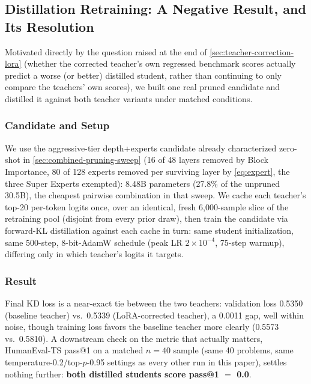 \documentclass{article}
\theoremstyle{plain}
\theoremstyle{definition}
\theoremstyle{remark}
\begin{document}
\subsection{Distillation Retraining: A Negative Result, and Its Resolution}
\label{sec:phase4-negative}

Motivated directly by the question raised at the end of
\cref{sec:teacher-correction-lora} (whether the corrected teacher's own
regressed benchmark scores actually predict a worse (or better) distilled
student, rather than continuing to only compare the teachers' own scores),
we built one real pruned candidate and distilled it against both
teacher variants under matched conditions.

\subsubsection{Candidate and Setup}

We use the aggressive-tier depth+experts candidate already characterized
zero-shot in \cref{sec:combined-pruning-sweep} (16 of 48 layers removed by
Block Importance, 80 of 128 experts removed per surviving layer by
\cref{eq:expert}, the three Super Experts exempted): 8.48B parameters
(27.8\% of the unpruned 30.5B), the cheapest pairwise combination in that
sweep. We cache each teacher's top-20 per-token logits once, over an
identical, fresh 6,000-sample slice of the retraining pool (disjoint from
every prior draw), then train the candidate via forward-KL distillation
against each cache in turn: same student initialization, same 500-step,
8-bit-AdamW schedule (peak LR $2\times10^{-4}$, 75-step warmup), differing
only in which teacher's logits it targets.

\subsubsection{Result}

Final KD loss is a near-exact tie between the two teachers: validation
loss 0.5350 (baseline teacher) vs.\ 0.5339 (LoRA-corrected teacher), a
0.0011 gap, well within noise, though training loss favors the baseline
teacher more clearly (0.5573 vs.\ 0.5810). A downstream check on the
metric that actually matters, HumanEval-TS pass@1 on a matched $n{=}40$
sample (same 40 problems, same temperature-0.2/top-$p$-0.95 settings as
every other run in this paper), settles nothing further: \textbf{both
distilled students score pass@1 $=$ 0.0}.
\end{document}
